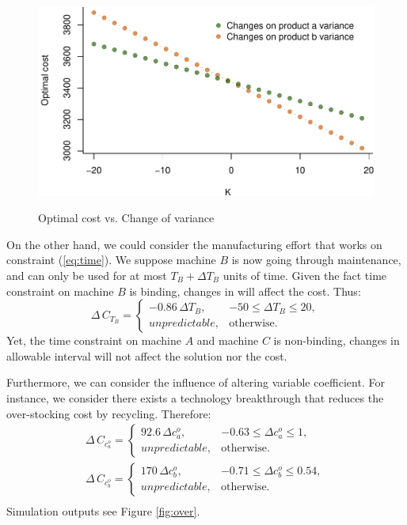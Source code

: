 \documentclass[a4paper,11pt]{article}
\begin{document}
\begin{figure}[ht]
\centering
\caption{Optimal cost vs. Change of variance}
\includegraphics{Example-figure_files/figure-latex/var-1.pdf}
\label{fig:var}
\end{figure}

On the other hand, we could consider the manufacturing effort that works on constraint (\ref{eq:time}). We suppose machine $B$ is now going through maintenance, and can only be used for at most $T_B + \Delta T_B$ units of time. Given the fact time constraint on machine $B$ is binding, changes in will affect the cost. Thus:
\[
    \Delta \, C_{T_B} = 
    \begin{cases}
        -0.86 \, \Delta T_B, & -50 \leq \Delta T_B \leq 20,\\
        unpredictable, & \text{otherwise}.
    \end{cases}
\]
Yet, the time constraint on machine $A$ and machine $C$ is non-binding, changes in allowable interval will not affect the solution nor the cost.

Furthermore, we can consider the influence of altering variable coefficient. For instance, we consider there exists a technology breakthrough that reduces the over-stocking cost by recycling. Therefore:
\[
\begin{aligned}
    \Delta \, C_{c_a^o} = 
    \begin{cases}
        92.6 \, \Delta c_a^o, & -0.63 \leq \Delta c_a^o \leq 1,\\
        unpredictable, & \text{otherwise}.
    \end{cases}\\
    \Delta \, C_{c_b^o} = 
    \begin{cases}
        170 \, \Delta c_b^o, & -0.71 \leq \Delta c_b^o \leq 0.54,\\
        unpredictable, & \text{otherwise}.
    \end{cases}\\
\end{aligned}
\]
Simulation outputs see Figure \ref{fig:over}.
\end{document}

